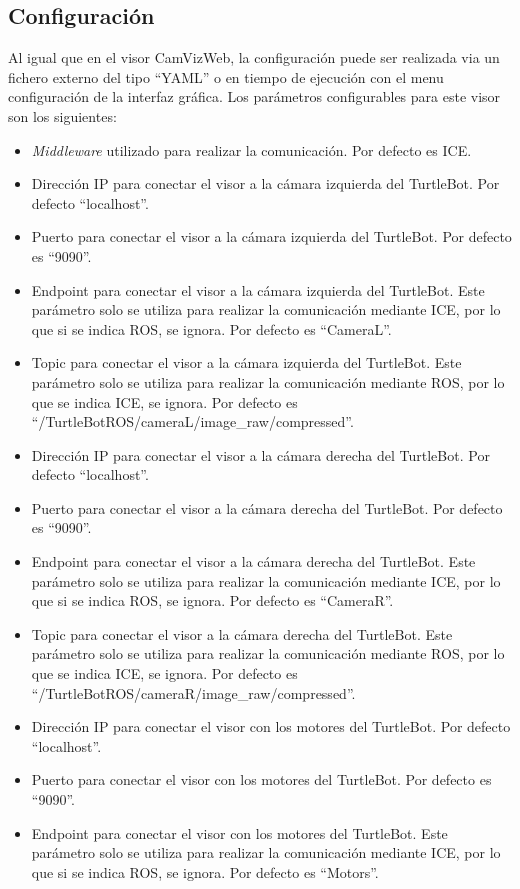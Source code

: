 \subsection{Configuración}
Al igual que en el visor CamVizWeb, la configuración puede ser realizada via un fichero externo del tipo ``YAML'' o en tiempo de ejecución con el menu configuración de la interfaz gráfica. Los parámetros configurables para este visor son los siguientes:
\begin{itemize}
\item \textit{Middleware} utilizado para realizar la comunicación. Por defecto es ICE.
\item Dirección IP para conectar el visor a la cámara izquierda del TurtleBot. Por defecto ``localhost''.
\item Puerto para conectar el visor a la cámara izquierda del TurtleBot. Por defecto es ``9090''.
\item Endpoint para conectar el visor a la cámara izquierda del TurtleBot. Este parámetro solo se utiliza para realizar la comunicación mediante ICE, por lo que si se indica ROS, se ignora. Por defecto es ``CameraL''.
\item Topic para conectar el visor a la cámara izquierda del TurtleBot. Este parámetro solo se utiliza para realizar la comunicación mediante ROS, por lo que se indica ICE, se ignora. Por defecto es ``/TurtleBotROS/cameraL/image\_raw/compressed''.
\item Dirección IP para conectar el visor a la cámara derecha del TurtleBot. Por defecto ``localhost''.
\item Puerto para conectar el visor a la cámara derecha del TurtleBot. Por defecto es ``9090''.
\item Endpoint para conectar el visor a la cámara derecha del TurtleBot. Este parámetro solo se utiliza para realizar la comunicación mediante ICE, por lo que si se indica ROS, se ignora. Por defecto es ``CameraR''.
\item Topic para conectar el visor a la cámara derecha del TurtleBot. Este parámetro solo se utiliza para realizar la comunicación mediante ROS, por lo que se indica ICE, se ignora. Por defecto es ``/TurtleBotROS/cameraR/image\_raw/compressed''.
\item Dirección IP para conectar el visor con los motores del TurtleBot. Por defecto ``localhost''.
\item Puerto para conectar el visor con los motores del TurtleBot. Por defecto es ``9090''.
\item Endpoint para conectar el visor con los motores del TurtleBot. Este parámetro solo se utiliza para realizar la comunicación mediante ICE, por lo que si se indica ROS, se ignora. Por defecto es ``Motors''.

\end{itemize}

